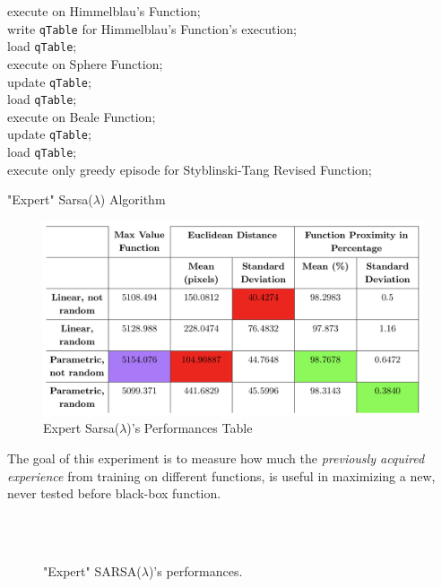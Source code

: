 \begin{algorithm} [h!]

 {
	{execute on Himmelblau's Function; \\
		write {\tt qTable} for Himmelblau's Function's execution; \\
		load {\tt qTable}; \\
		execute on Sphere Function; \\
		update {\tt qTable}; \\
		load {\tt qTable}; \\
		execute on Beale Function; \\
		update {\tt qTable}; \\
		load {\tt qTable}; \\
		execute only greedy episode for Styblinski-Tang Revised Function;
	} 
}
	\caption{"Expert" Sarsa($\lambda$) Algorithm} 
	\label{ExpertAlgo}
\end{algorithm}

\begin{figure} [h!]
	\centering
	\includegraphics[width=\linewidth]{IMAGES/ExpertReasumingTable}
	\caption{Expert Sarsa($\lambda$)'s Performances Table}
	\label{fig:expertreasumingtable}
\end{figure}
 
The goal of this experiment is to measure how much the \textit{previously acquired experience} from training on different functions, is useful in maximizing a new, never tested before black-box function.

\begin{figure}[h!]
	\begin{center}
		\\
		 \\
		
	\end{center}
	\caption{
		"Expert" SARSA($\lambda$)'s  performances.
	}
	\label{fig:ExpertResults}
\end{figure}

